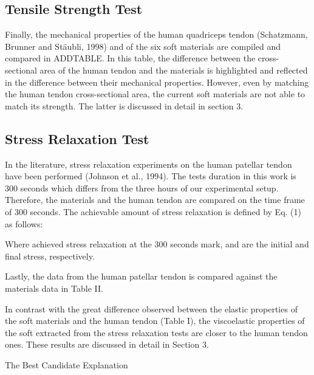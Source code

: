 \subsection{Tensile Strength Test}

Finally, the mechanical properties of the human quadriceps tendon (Schatzmann, Brunner and St{\"a}ubli, 1998) and of the six soft materials are compiled and compared in ADDTABLE. In this table, the difference between the cross-sectional area of the human tendon and the materials is highlighted and reflected in the difference between their mechanical properties. However, even by matching the human tendon cross-sectional area, the current soft materials are not able to match its strength. The latter is discussed in detail in section 3.

\subsection{Stress Relaxation Test}

In the literature, stress relaxation experiments on the human patellar tendon have been performed (Johnson et al., 1994). The tests duration in this work is 300 seconds which differs from the three hours of our experimental setup. Therefore, the materials and the human tendon are compared on the time frame of 300 seconds. The achievable amount of stress relaxation is defined by Eq. (1) as follows:

Where achieved stress relaxation at the 300 seconds mark,  and  are the initial and final stress, respectively. 

Lastly, the data from the human patellar tendon is compared against the materials data in Table II.

In contrast with the great difference observed between the elastic properties of the soft materials and the human tendon (Table I), the viscoelastic properties of the soft  extracted from the stress relaxation tests are closer to the human tendon ones. These results are discussed in detail in Section 3.


{\huge The Best Candidate Explanation}

